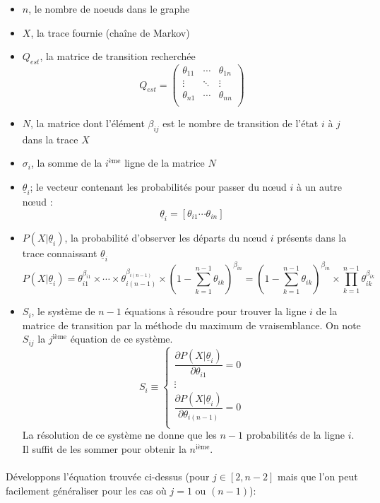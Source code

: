 \documentclass[a4paper,titlepage]{report}
\begin{document}
\begin{itemize}
	\item $n$, le nombre de noeuds dans le graphe
	\item $X$, la trace fournie (chaîne de Markov)
	\item $Q_{est}$, la matrice de transition recherchée
	\[
		Q_{est} = 
		\begin{pmatrix}
			\theta_{11} & \cdots & \theta_{1n}\\
			\vdots & \ddots & \vdots\\
			\theta_{n1} & \cdots & \theta_{nn}\\
		\end{pmatrix}
	\]
	\item $N$, la matrice dont l'élément $\beta_{ij}$ est le nombre de transition de l'état $i$ à $j$ dans la trace $X$
	\item $\sigma_i$, la somme de la $i^{\text{ème}}$ ligne de la matrice $N$
	\item $\underline{\theta}_i$; le vecteur contenant les probabilités pour passer du nœud $i$ à un autre nœud : 
	\[
		\underline{\theta}_i = [\theta_{i1} \cdots \theta_{in}]
	\]
	\item $P(X|\underline{\theta}_i)$, la probabilité d'observer les départs du nœud $i$ présents dans la trace connaissant $\underline{\theta}_i$ 
	\[
		P(X|\underline{\theta}_i) = \theta_{i1}^{\beta_{i1}} \times \cdots \times \theta_{i(n - 1)}^{\beta_{i(n - 1)}} \times \left(1 - \sum\limits_{k = 1}^{n - 1} \theta_{ik}\right)^{\beta_{in}} = \left(1 - \sum\limits_{k = 1}^{n - 1} \theta_{ik}\right)^{\beta_{in}} \times \prod\limits_{k = 1}^{n - 1} \theta_{ik}^{\beta_{ik}}
	\]
	\item $S_i$, le système de $n - 1$ équations à résoudre pour trouver la ligne $i$ de la matrice de transition par la méthode du maximum de vraisemblance. On note $S_{ij}$ la $j^{\text{ième}}$ équation de ce système.
	\[
		S_i \equiv 
		\left\{
		\begin{array}{c}
		\dfrac{\partial P(X|\underline{\theta}_i)}{\partial \theta_{i1}} = 0\\
		\vdots\\
		\dfrac{\partial P(X|\underline{\theta}_i)}{\partial \theta_{i(n-1)}} = 0\\
		\end{array}
		\right.
	\] 
	La résolution de ce système ne donne que les $n-1$ probabilités de la ligne $i$. Il suffit de les sommer pour obtenir la $n^{\text{ième}}$.
\end{itemize}
\paragraph{}
Développons l'équation trouvée ci-dessus (pour $j \in [2, n-2]$ mais que l'on peut facilement généraliser pour les cas où $j = 1$ ou $(n-1)$):
\end{document}
